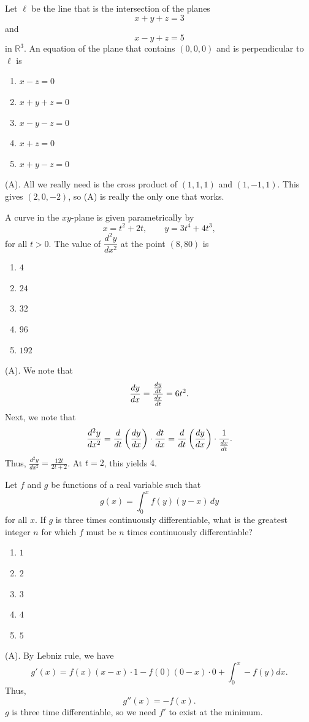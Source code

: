 \begin{exercise}
Let $\ell$ be the line that is the intersection of the planes
\[
x+y+z=3
\]
and
\[
x-y+z=5
\]
in $\mathbb{R}^3$. An equation of the plane that contains $(0,0,0)$ and is perpendicular to $\ell$ is
\begin{enumerate}[label=(\Alph*)]
    \item $x-z=0$
    \item $x+y+z=0$
    \item $x-y-z=0$
    \item $x+z=0$
    \item $x+y-z=0$
\end{enumerate}
\end{exercise}
\begin{solution}
(A). All we really need is the cross product of $(1,1,1)$ and $(1,-1,1)$.
This gives $(2,0,-2)$, so (A) is really the only one that works.
\end{solution}

\begin{exercise}
A curve in the $xy$-plane is given parametrically by
\[
x=t^2+2t,
\qquad
y=3t^4+4t^3,
\]
for all $t>0$. The value of $\dfrac{d^2y}{dx^2}$ at the point $(8,80)$ is

\begin{enumerate}[label=(\Alph*)]
    \item $4$
    \item $24$
    \item $32$
    \item $96$
    \item $192$
\end{enumerate}
\end{exercise}
\begin{solution}
(A). We note that 
\[
\frac{d y}{d x} = \frac{\frac{d y}{d t}}{\frac{d x}{d t}} = 6t^2.
\]
Next, we note that 
\[
\frac{d^2y}{dx^2} = \frac{d }{d t}\left(\frac{d y}{d x}\right) \cdot \frac{d t}{d x}
= \frac{d }{d t}\left(\frac{d y}{d x}\right) \cdot \frac{1}{\frac{d x}{d t}}.
\]
Thus, $\frac{d^2y}{dx^2} = \frac{12t}{2t + 2}$. At $t = 2$, this yields $4$.
\end{solution}

\begin{exercise}
Let $f$ and $g$ be functions of a real variable such that
\[
g(x)=\int_0^x f(y)(y-x)\,dy
\]
for all $x$. If $g$ is three times continuously differentiable, what is the greatest integer $n$ for which $f$ must be $n$ times continuously differentiable?
\begin{enumerate}[label=(\Alph*)]
    \item $1$
    \item $2$
    \item $3$
    \item $4$
    \item $5$
\end{enumerate}
\end{exercise}
\begin{solution}
(A). By Lebniz rule, we have
\[
g'(x) = f(x)(x-x)\cdot 1 - f(0)(0-x)\cdot 0 + \int_0^x -f(y) dx.
\]
Thus, 
\[
g''(x) = -f(x).
\]
$g$ is three time differentiable, so we need $f'$ to exist at the minimum.
\end{solution}

